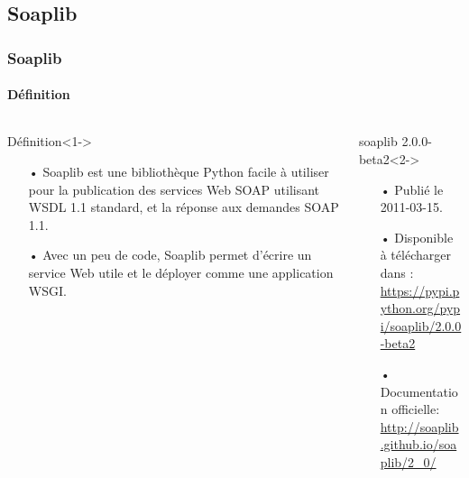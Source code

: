 \subsection{Soaplib}
\begin{frame}
\frametitle{Soaplib}
\framesubtitle{Définition}
\transwipe[duration=2]
\begin{columns}
\begin{column}{8.5cm}
\begin{block}{Définition}<1->
\vspace*{0.1cm}
\begin{itemize}
\item[•] \textcolor{deepgreen}{Soaplib} est une bibliothèque Python facile à utiliser pour la publication des services Web \textcolor{deepred}{SOAP} utilisant \textcolor{deepred}{WSDL 1.1} standard, et la réponse aux demandes \textcolor{deepred}{SOAP 1.1}. 
\item[•] Avec un peu de code, \textcolor{deepgreen}{Soaplib} permet d'écrire un service Web utile et le déployer comme une application \textcolor{deepblue}{WSGI}.
\vspace*{0.3cm}
\end{itemize}
\end{block}
\end{column}
\begin{column}{8.5cm}
\begin{block}{soaplib 2.0.0-beta2}<2->
\vspace*{0.2cm}
\begin{itemize}
\item[•] Publié le 2011-03-15.
\item[•] Disponible à télécharger dans :\\
\textcolor{urlcolor}{\url{https://pypi.python.org/pypi/soaplib/2.0.0-beta2}}\\
\item[•] Documentation officielle:\\
\textcolor{urlcolor}{\url{http://soaplib.github.io/soaplib/2_0/}}
\end{itemize}
\vspace*{0.3cm}
\end{block}
\end{column}
\end{columns}
\end{frame}

